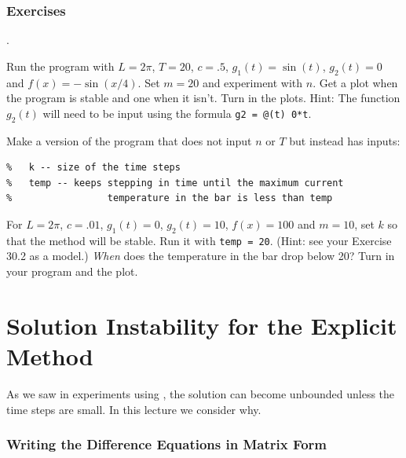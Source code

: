 \newpage
\subsection*{Exercises}
\begin{list}
{.}{}


\item Run the program  with $L = 2\pi$, $T=20$, $c =
  .5$, $g_1(t) = \sin(t)$, $g_2(t) =0$ and $f(x) = -\sin(x/4)$.  Set
  $m=20$ and experiment with $n$. Get a plot when the program is
  stable and one when it isn't. Turn in the plots. Hint: The function $g_2(t)$ will need
  to be input using the formula \verb&g2 = @(t) 0*t&.
  

\item Make a version of the program  that does not
  input $n$ or $T$ but instead has inputs:
\begin{lstlisting}
%   k -- size of the time steps
%   temp -- keeps stepping in time until the maximum current 
%                 temperature in the bar is less than temp
\end{lstlisting}
For $L = 2\pi$, $c = .01$, $g_1(t) = 0$, $g_2(t) = 10$, $f(x) = 100$
and $m = 10$, set $k$ so that the method will be stable.  Run it with
\verb&temp = 20&.  (Hint: see your Exercise 30.2 as a model.)
{\it When}  does the 
temperature in the bar drop below 20? Turn in your program and the plot.

\end{list}




\chapter{Solution Instability for the Explicit Method}

As we saw in experiments using , the solution
can become unbounded unless the time steps are small. In this lecture
we consider why.


\subsection*{Writing the Difference Equations in Matrix Form}

